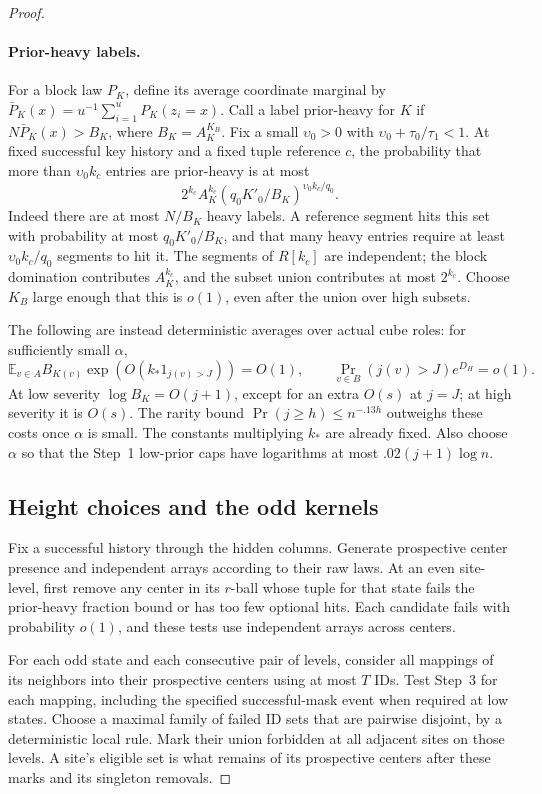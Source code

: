 \begin{proof}
\paragraph{Prior-heavy labels.}
For a block law \(P_K\), define its average coordinate marginal by
\(\bar P_K(x)=u^{-1}\sum_{i=1}^uP_K(z_i=x)\). Call a label
prior-heavy for \(K\) if \(N\bar P_K(x)>B_K\), where
\(B_K=A_K^{K_B}\). Fix a small \(\upsilon_0>0\) with
\(\upsilon_0+\tau_0/\tau_1<1\). At fixed successful key history and a
fixed tuple reference \(c\), the probability that more than
\(\upsilon_0k_c\) entries are prior-heavy is at most
\[
 2^{k_c}A_K^{k_c}
       \left(q_0K'_0/B_K\right)^{\upsilon_0k_c/q_0}.
\]
Indeed there are at most \(N/B_K\) heavy labels. A reference segment
hits this set with probability at most \(q_0K'_0/B_K\), and that many
heavy entries require at least \(\upsilon_0k_c/q_0\) segments to hit
it. The segments of \(R[k_c]\) are independent; the block domination
contributes \(A_K^{k_c}\), and the subset union contributes at most
\(2^{k_c}\). Choose \(K_B\) large enough that this is \(o(1)\), even
after the union over high subsets.

The following are instead deterministic averages over actual cube roles:
for sufficiently small \(\alpha\),
\[
 \mathbb E_{v\in A}B_{K(v)}\exp(O(k_*1_{j(v)>J}))=O(1),\qquad
 \Pr_{v\in B}(j(v)>J)e^{D_H}=o(1).
\]
At low severity \(\log B_K=O(j+1)\), except for an extra \(O(s)\)
at \(j=J\); at high severity it is \(O(s)\). The rarity bound
\(\Pr(j\ge h)\le n^{-.13h}\) outweighs these costs once \(\alpha\)
is small. The constants multiplying \(k_*\) are already fixed. Also
choose \(\alpha\) so that the Step~1 low-prior caps have logarithms
at most \(.02(j+1)\log n\).

\subsection{Height choices and the odd kernels}
\label{sec:height-choices-and-the-odd-kernels}

Fix a successful history through the hidden columns. Generate prospective
center presence and independent arrays according to their raw laws. At
an even site-level, first remove any center in its \(r\)-ball whose
tuple for that state fails the prior-heavy fraction bound or has too few
optional hits. Each candidate fails with probability \(o(1)\), and
these tests use independent arrays across centers.

For each odd state and each consecutive pair of levels, consider all
mappings of its neighbors into their prospective centers using at most
\(T\) IDs. Test Step~3 for each mapping, including the specified
successful-mask event when required at low states. Choose a maximal
family of failed ID sets that are pairwise disjoint, by a deterministic
local rule. Mark their union forbidden at all adjacent sites on those
levels. A site's eligible set is what remains of its prospective centers
after these marks and its singleton removals.


\end{proof}
